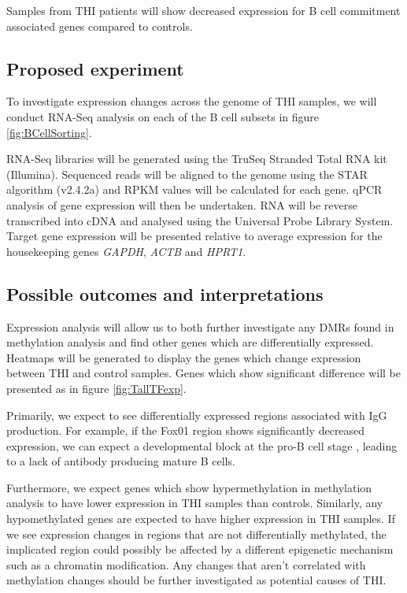 \documentclass[12pt]{article}
\begin{document}
			Samples from THI patients will show decreased expression for B cell commitment associated genes compared to controls.
					
		\subsection{Proposed experiment}
			
			To investigate expression changes across the genome of THI samples, we will conduct RNA-Seq analysis on each of the B cell subsets in figure \ref{fig:BCellSorting}. 

			RNA-Seq libraries will be generated using the TruSeq Stranded Total RNA kit (Illumina). 
			Sequenced reads will be aligned to the genome using the STAR algorithm (v2.4.2a)\citep{Dobin13} and RPKM values will be calculated for each gene.
			qPCR analysis of gene expression will then be undertaken. 
			RNA will be reverse transcribed into cDNA and analysed using the Universal Probe Library System. 
			Target gene expression will be presented relative to average expression for the housekeeping genes \textit{GAPDH}, \textit{ACTB} and \textit{HPRT1}.
			
		\subsection{Possible outcomes and interpretations}				
			
			Expression analysis will allow us to both further investigate any DMRs found in methylation analysis and find other genes which are differentially expressed. 
			Heatmaps will be generated to display the genes which change expression between THI and control samples. 
			Genes which show significant difference will be presented as in figure \ref{fig:TallTFexp}.
			
			Primarily, we expect to see differentially expressed regions associated with IgG production. 
			For example, if the Fox01 region shows significantly decreased expression, we can expect a developmental block at the pro-B cell stage \citep{Choukrallah14}, leading to a lack of antibody producing mature B cells.
			
			Furthermore, we expect genes which show hypermethylation in methylation analysis to have lower expression in THI samples than controls. 
			Similarly, any hypomethylated genes are expected to have higher expression in THI samples.
			If we see expression changes in regions that are not differentially methylated, the implicated region could possibly be affected by a different epigenetic mechanism such as a chromatin modification.
			Any changes that aren't correlated with methylation changes should be further investigated as potential causes of THI.
			
\end{document}
